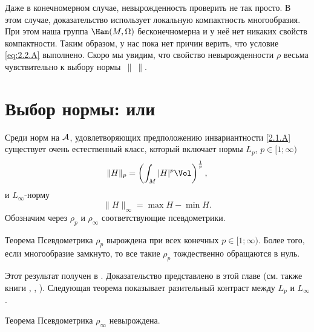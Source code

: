 Даже в конечномерном случае, невырожденность проверить не так просто.
В этом случае, доказательство использует локальную компактность многообразия.
При этом наша группа $\Ham (M, \Omega)$ бесконечномерна и у неё нет никаких свойств компактности.
Таким образом, у нас пока нет причин верить, что условие \ref{eq:2.2.A} выполнено.
Скоро мы увидим, что свойство невырожденности $\rho$ весьма чувствительно к выбору нормы~$\|\ \|$.

\section[\texorpdfstring{Выбор нормы: $L_p$ или $L_\infty$}{Выбор нормы: Lₚ или L∞}]{Выбор нормы:  или }

Среди норм на $\mathcal{A}$, удовлетворяющих предположению инвариантности
\ref{2.1.A} существует очень естественный класс, который включает
нормы $L_p$, $p \in [1;\infty)$
\[\|H\|_p=\left(\int_M|H|^p\Vol\right)^{\frac1p},\]
и $L_\infty$-норму 
\[\|H\|_\infty = \max H - \min H.\]
Обозначим через $\rho_p$ и $\rho_\infty$ соответствующие псевдометрики.

\begin{thm}{Теорема}\label{2.3.A}
Псевдометрика $\rho_p$ вырождена при всех конечных $p \in [1;\infty)$.
Более того, если многообразие замкнуто, то все такие $\rho_p$ тождественно обращаются в нуль.
\end{thm}

Этот результат получен в \cite{EP}.
Доказательство представлено в этой главе (см. также книги \cite{HZ}, \cite{MS}, \cite{AK}).
Следующая теорема показывает разительный контраст между $L_p$ и $L_\infty$.

\begin{thm}{Теорема}\label{2.3.B}
Псевдометрика $\rho_\infty$ невырождена.
\end{thm}

